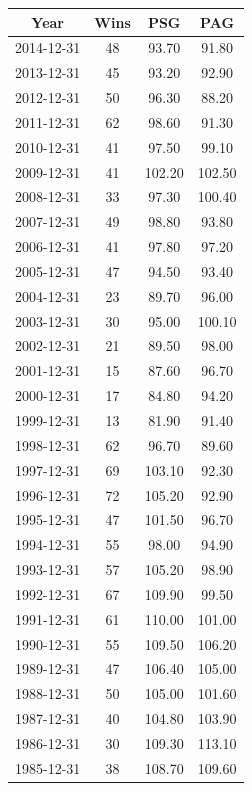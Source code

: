 \documentclass[a4paper]{article}
\begin{document}
\begin{table}[H]
\centering
\begin{tabular}{| c | c | c | c|}
  \hline
Year & Wins & PSG & PAG \\ 
  \hline
2014-12-31 & 48 & 93.70 & 91.80 \\ 
  2013-12-31 & 45 & 93.20 & 92.90 \\ 
  2012-12-31 & 50 & 96.30 & 88.20 \\ 
  2011-12-31 & 62 & 98.60 & 91.30 \\ 
  2010-12-31 & 41 & 97.50 & 99.10 \\ 
  2009-12-31 & 41 & 102.20 & 102.50 \\ 
  2008-12-31 & 33 & 97.30 & 100.40 \\ 
  2007-12-31 & 49 & 98.80 & 93.80 \\ 
  2006-12-31 & 41 & 97.80 & 97.20 \\ 
  2005-12-31 & 47 & 94.50 & 93.40 \\ 
  2004-12-31 & 23 & 89.70 & 96.00 \\ 
  2003-12-31 & 30 & 95.00 & 100.10 \\ 
  2002-12-31 & 21 & 89.50 & 98.00 \\ 
  2001-12-31 & 15 & 87.60 & 96.70 \\ 
  2000-12-31 & 17 & 84.80 & 94.20 \\ 
  1999-12-31 & 13 & 81.90 & 91.40 \\ 
  1998-12-31 & 62 & 96.70 & 89.60 \\ 
  1997-12-31 & 69 & 103.10 & 92.30 \\ 
  1996-12-31 & 72 & 105.20 & 92.90 \\ 
  1995-12-31 & 47 & 101.50 & 96.70 \\ 
  1994-12-31 & 55 & 98.00 & 94.90 \\ 
  1993-12-31 & 57 & 105.20 & 98.90 \\ 
  1992-12-31 & 67 & 109.90 & 99.50 \\ 
  1991-12-31 & 61 & 110.00 & 101.00 \\ 
  1990-12-31 & 55 & 109.50 & 106.20 \\ 
  1989-12-31 & 47 & 106.40 & 105.00 \\ 
  1988-12-31 & 50 & 105.00 & 101.60 \\ 
  1987-12-31 & 40 & 104.80 & 103.90 \\ 
  1986-12-31 & 30 & 109.30 & 113.10 \\ 
  1985-12-31 & 38 & 108.70 & 109.60 \\ 

\end{tabular}
\end{table}
\end{document}
